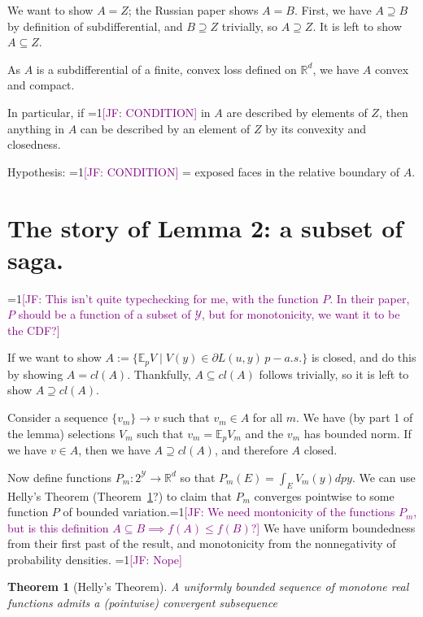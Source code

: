 \documentclass{article}
\newcommand{\Comments}{1}
\newcommand{\mynote}[2]{\ifnum\Comments=1\textcolor{#1}{#2}\fi}
\newcommand{\jessie}[1]{\mynote{purple}{[JF: #1]}}
\newcommand{\reals}{\mathbb{R}}
\newcommand{\E}{\mathbb{E}}
\newcommand{\Y}{\mathcal{Y}}
\newtheorem{theorem}{Theorem}
\begin{document}
We want to show $A = Z$; the Russian paper shows $A =B$.
First, we have $A \supseteq B$ by definition of subdifferential, and $B \supseteq Z$ trivially, so $A \supseteq Z$.
It is left to show $A \subseteq Z$.

As $A$ is a subdifferential of a finite, convex loss defined on $\reals^d$, we have $A$ convex and compact.

In particular, if \jessie{CONDITION} in $A$ are described by elements of $Z$, then anything in $A$ can be described by an element of $Z$ by its convexity and closedness.

Hypothesis: \jessie{CONDITION} = exposed faces in the relative boundary of $A$.

\section{The story of Lemma 2: a subset of saga.}

\jessie{This isn't quite typechecking for me, with the function $P$.  In their paper, $P$ should be a function of a subset of $\Y$, but for monotonicity, we want it to be the CDF?}

If we want to show $A := \{\E_p V \mid V(y) \in \partial L(u,y) \, p-a.s.\}$ is closed, and do this by showing $A = cl(A)$.  Thankfully, $A \subseteq cl(A)$ follows trivially, so it is left to show $A \supseteq cl(A)$.

Consider a sequence $\{v_m\} \to v$ such that $v_m \in A$ for all $m$.  We have (by part 1 of the lemma) selections $V_m$ such that $v_m = \E_p V_m$ and the $v_m$ has bounded norm.
If we have $v \in A$, then we have $A \supseteq cl(A)$, and therefore $A$ closed.

Now define functions $P_m : 2^\Y \to \reals^d$ so that $P_m(E) = \int_E V_m(y) dpy$.  
We can use Helly's Theorem (Theorem~\ref{thm:helly}?) to claim that $P_m$ converges pointwise to some function $P$ of bounded variation.\jessie{We need montonicity of the functions $P_m$, but is this definition $A \subseteq B \implies f(A) \leq f(B)$?}
We have uniform boundedness from their first past of the result, and monotonicity from the nonnegativity of probability densities. \jessie{Nope}%

\begin{theorem}[Helly's Theorem]\label{thm:helly}
	A uniformly bounded sequence of monotone real functions admits a (pointwise) convergent subsequence
\end{theorem}
\end{document}
